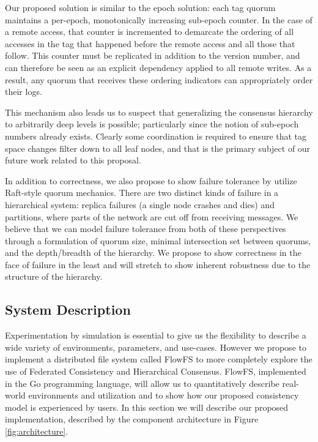 \documentclass{article}
\begin{document}
Our proposed solution is similar to the epoch solution: each tag quorum maintains a per-epoch, monotonically increasing sub-epoch counter. In the case of a remote access, that counter is incremented to demarcate the ordering of all accesses in the tag that happened before the remote access and all those that follow. This counter must be replicated in addition to the version number, and can therefore be seen as an explicit dependency applied to all remote writes. As a result, any quorum that receives these ordering indicators can appropriately order their logs.

This mechanism also leads us to suspect that generalizing the consensus hierarchy to arbitrarily deep levels is possible; particularly since the notion of sub-epoch numbers already exists. Clearly some coordination is required to ensure that tag space changes filter down to all leaf nodes, and that is the primary subject of our future work related to this proposal.

In addition to correctness, we also propose to show failure tolerance by utilize Raft-style quorum mechanics. There are two distinct kinds of failure in a hierarchical system: replica failures (a single node crashes and dies) and partitions, where parts of the network are cut off from receiving messages. We believe that we can model failure tolerance from both of these perspectives through a formulation of quorum size, minimal intersection set between quorums, and the depth/breadth of the hierarchy. We propose to show correctness in the face of failure in the least and will stretch to show inherent robustness due to the structure of the hierarchy.

\subsection{System Description}
\label{sec:system}

Experimentation by simulation is essential to give us the flexibility to describe a wide variety of environments, parameters, and use-cases. However we propose to implement a distributed file system called FlowFS to more completely explore the use of Federated Consistency and Hierarchical Consensus. FlowFS, implemented in the Go programming language, will allow us to quantitatively describe real-world environments and utilization and to show how our proposed consistency model is experienced by users. In this section we will describe our proposed implementation, described by the component architecture in Figure \ref{fig:architecture}.
\end{document}
